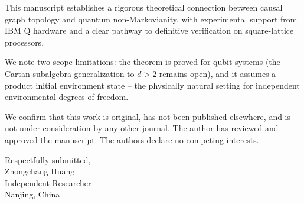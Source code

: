 \documentclass[11pt]{article}
\begin{document}
This manuscript establishes a rigorous theoretical connection between causal graph topology and quantum non-Markovianity, with experimental support from IBM Q hardware and a clear pathway to definitive verification on square-lattice processors.

We note two scope limitations: the theorem is proved for qubit systems (the Cartan subalgebra generalization to $d>2$ remains open), and it assumes a product initial environment state -- the physically natural setting for independent environmental degrees of freedom.

We confirm that this work is original, has not been published elsewhere, and is not under consideration by any other journal. The author has reviewed and approved the manuscript. The authors declare no competing interests.

\begin{flushright}
Respectfully submitted,\\[1.5em]
Zhongchang Huang\\
Independent Researcher\\
Nanjing, China
\end{flushright}
\end{document}
